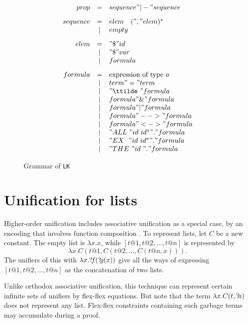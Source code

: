 \begin{figure} 
\dquotes
\[\begin{array}{rcl}
    prop & = & sequence " |- " sequence 
\\[2ex]
sequence & = & elem \quad (", " elem)^* \\
         & | & empty 
\\[2ex]
    elem & = & "\$ " id \\
         & | & "\$ " var \\
         & | & formula 
\\[2ex]
 formula & = & \hbox{expression of type~$o$} \\
         & | & term " = " term \\
         & | & "\ttilde\ " formula \\
         & | & formula " \& " formula \\
         & | & formula " | " formula \\
         & | & formula " --> " formula \\
         & | & formula " <-> " formula \\
         & | & "ALL~" id~id^* " . " formula \\
         & | & "EX~~" id~id^* " . " formula \\
         & | & "THE~" id~     " . " formula
  \end{array}
\]
\caption{Grammar of {\tt LK}} \label{lk-grammar}
\end{figure}


\section{Unification for lists}
Higher-order unification includes associative unification as a special
case, by an encoding that involves function composition
\cite[page~37]{huet78}.  To represent lists, let $C$ be a new constant.
The empty list is $\lambda x. x$, while $[t@1,t@2,\ldots,t@n]$ is
represented by
\[ \lambda x. C(t@1,C(t@2,\ldots,C(t@n,x))).  \]
The unifiers of this with $\lambda x.{?\!f}({?\!g}(x))$ give all the ways
of expressing $[t@1,t@2,\ldots,t@n]$ as the concatenation of two lists.

Unlike orthodox associative unification, this technique can represent certain
infinite sets of unifiers by flex-flex equations.   But note that the term
$\lambda x. C(t,{?\!a})$ does not represent any list.  Flex-flex constraints
containing such garbage terms may accumulate during a proof.

